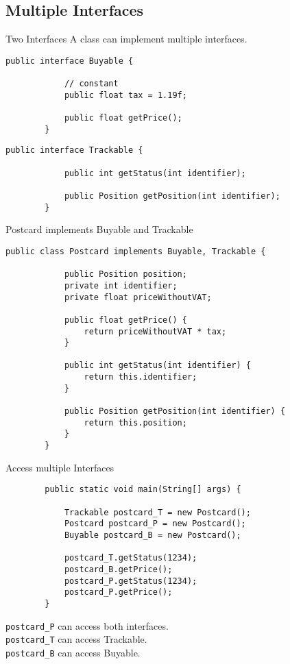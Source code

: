 \subsection{Multiple Interfaces}
\begin{frame}[fragile]{Two Interfaces}
	A class can implement multiple interfaces.
	\vfill
	\begin{lstlisting}[basicstyle=\ttfamily\scriptsize]
		public interface Buyable {
			
			// constant
			public float tax = 1.19f;
			
			public float getPrice();
		}
	\end{lstlisting}
	\begin{lstlisting}[basicstyle=\ttfamily\scriptsize]
		public interface Trackable {
			
			public int getStatus(int identifier);
			
			public Position getPosition(int identifier);
		}
	\end{lstlisting}
\end{frame}

\begin{frame}[fragile]{Postcard implements Buyable and Trackable}
	\begin{lstlisting}[basicstyle=\ttfamily\scriptsize]
		public class Postcard implements Buyable, Trackable {
			
			public Position position;
			private int identifier;
			private float priceWithoutVAT;
			
			public float getPrice() {
				return priceWithoutVAT * tax;
			}
			
			public int getStatus(int identifier) {
				return this.identifier;
			}
			
			public Position getPosition(int identifier) {
				return this.position;
			}
		}
	\end{lstlisting}
\end{frame}

\begin{frame}[fragile]{Access multiple Interfaces}
	\begin{lstlisting}
		public static void main(String[] args) {
			
			Trackable postcard_T = new Postcard();
			Postcard postcard_P = new Postcard();
			Buyable postcard_B = new Postcard();
			
			postcard_T.getStatus(1234);
			postcard_B.getPrice();
			postcard_P.getStatus(1234);
			postcard_P.getPrice();
		}
	\end{lstlisting}
	\texttt{postcard\_P} can access both interfaces.\\
	\texttt{postcard\_T} can access Trackable.\\
	\texttt{postcard\_B} can access Buyable.
\end{frame}
